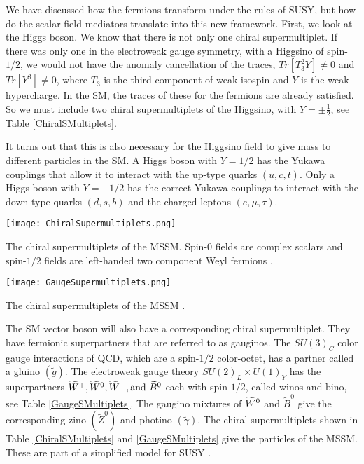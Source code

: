 We have discussed how the fermions transform under the rules of SUSY, but how do the scalar field mediators translate into this new framework. First, we look at the Higgs boson. We know that there is not only one chiral supermultiplet. If there was only one in the electroweak gauge symmetry, with a Higgsino of spin-$1/2$, we would not have the anomaly cancellation of the traces, $Tr[T^2_3Y]\neq0$ and $Tr[Y^3]\neq0$, where $T_3$ is the third component of weak isospin and $Y$ is the weak hypercharge. In the SM, the traces of these for the fermions are already satisfied. So we must include two chiral supermultiplets of the Higgsino, with $Y=\pm\frac{1}{2}$, see Table \ref{ChiralSMultiplets}. 

It turns out that this is also necessary for the Higgsino field to give mass to different particles in the SM. A Higgs boson with $Y=1/2$ has the Yukawa couplings that allow it to interact with the up-type quarks $(u, c, t)$. Only a Higgs boson with $Y=-1/2$ has the correct Yukawa couplings to interact with the down-type quarks $(d, s, b)$ and the charged leptons $(e, \mu, \tau)$.

\begin{table}
 	\centering
	\texttt{[image: ChiralSupermultiplets.png]}
 	\caption[Chiral supermultiplets for fermions and bosons]{The chiral supermultiplets of the MSSM. Spin-0 fields are complex scalars and spin-$1/2$ fields are left-handed two component Weyl fermions \cite{martin_supersymmetry_1997}.}
 	\label{ChiralSMultiplets} 
\end{table}

\begin{table}
 	\centering
	\texttt{[image: GaugeSupermultiplets.png]}
 	\caption[Chiral supermultiplets for gauge bosons]{The chiral supermultiplets of the MSSM \cite{martin_supersymmetry_1997}.}
 	\label{GaugeSMultiplets} 
\end{table}

The SM vector boson will also have a corresponding chiral supermultiplet. They have fermionic superpartners that are referred to as gauginos. The $SU(3)_C$ color gauge interactions of QCD, which are a spin-$1/2$ color-octet, has a partner called a gluino $(\widetilde{g})$. The electroweak gauge theory $SU(2)_L\times U(1)_Y$ has the superpartners $\widetilde{W}^+,\widetilde{W}^0, \widetilde{W}^-, \text{and } \widetilde{B}^0$ each with spin-$1/2$, called winos and bino, see Table \ref{GaugeSMultiplets}. The gaugino mixtures of $\widetilde{W}^0$ and $\widetilde{B}^0$ give the corresponding zino $(\widetilde{Z}^0)$ and photino $(\widetilde{\gamma})$. The chiral supermultiplets shown in Table \ref{ChiralSMultiplets} and \ref{GaugeSMultiplets} give the particles of the MSSM. These are part of a simplified model for SUSY \cite{alwall_simplified_2009, alwall_model-independent_2009, alves_simplified_2012, alves_where_2011, noauthor_phys._nodate}.

